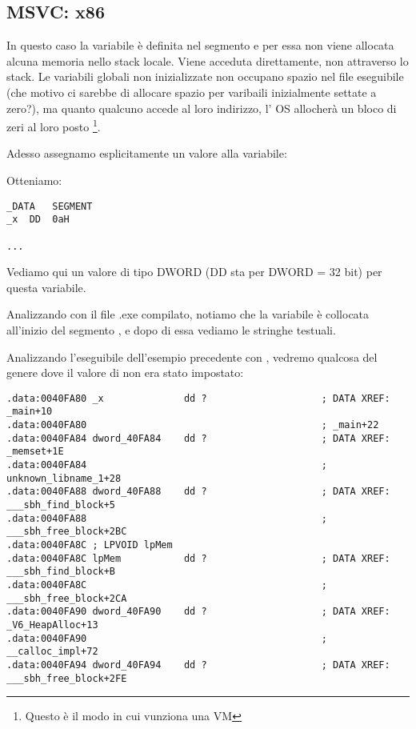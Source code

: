 \subsection{MSVC: x86}



In questo caso la variabile  è definita nel segmento  e per essa non viene allocata alcuna memoria nello stack locale. Viene acceduta direttamente, non attraverso lo stack.
Le variabili globali non inizializzate non occupano spazio nel file eseguibile 
(che motivo ci sarebbe di allocare spazio per varibaili inizialmente settate a zero?), 
ma quanto qualcuno accede al loro indirizzo, l' \ac{OS} allocherà un bloco di zeri al loro posto \footnote{Questo è il modo in cui vunziona una \ac{VM} }.

Adesso assegnamo esplicitamente un valore alla variabile:



Otteniamo:

\begin{lstlisting}
_DATA	SEGMENT
_x	DD	0aH

...
\end{lstlisting}

Vediamo qui un valore  di tipo DWORD (DD sta per DWORD = 32 bit) per questa variabile.

Analizzando con \IDA il file .exe compilato, notiamo che la variabile  è collocata all'inizio del segmento , e dopo di essa vediamo le stringhe testuali.

Analizzando l'eseguibile dell'esempio precedente con \IDA, vedremo qualcosa del genere dove il valore di  non era stato impostato:

\begin{lstlisting}
.data:0040FA80 _x              dd ?                    ; DATA XREF: _main+10
.data:0040FA80                                         ; _main+22
.data:0040FA84 dword_40FA84    dd ?                    ; DATA XREF: _memset+1E
.data:0040FA84                                         ; unknown_libname_1+28
.data:0040FA88 dword_40FA88    dd ?                    ; DATA XREF: ___sbh_find_block+5
.data:0040FA88                                         ; ___sbh_free_block+2BC
.data:0040FA8C ; LPVOID lpMem
.data:0040FA8C lpMem           dd ?                    ; DATA XREF: ___sbh_find_block+B
.data:0040FA8C                                         ; ___sbh_free_block+2CA
.data:0040FA90 dword_40FA90    dd ?                    ; DATA XREF: _V6_HeapAlloc+13
.data:0040FA90                                         ; __calloc_impl+72
.data:0040FA94 dword_40FA94    dd ?                    ; DATA XREF: ___sbh_free_block+2FE
\end{lstlisting}

